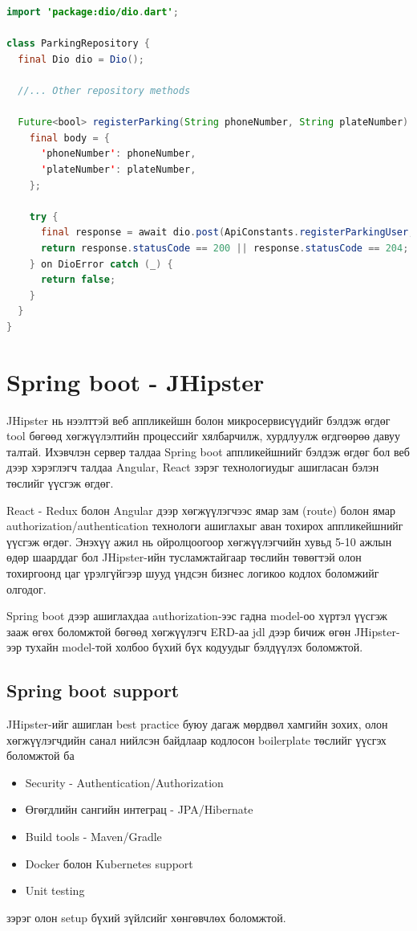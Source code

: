 \newpage

\begin{lstlisting}[language=Java, frame=single, caption=Машины дугаарыг хэрэглэгчийн дугаарын хамтаар сервер дээр бүртгэх]
import 'package:dio/dio.dart';

class ParkingRepository {
  final Dio dio = Dio();

  //... Other repository methods

  Future<bool> registerParking(String phoneNumber, String plateNumber) async {
    final body = {
      'phoneNumber': phoneNumber,
      'plateNumber': plateNumber,
    };

    try {
      final response = await dio.post(ApiConstants.registerParkingUser, data: jsonEncode(body));
      return response.statusCode == 200 || response.statusCode == 204;
    } on DioError catch (_) {
      return false;
    }
  }
}

\end{lstlisting}
\pagebreak

\section{Spring boot - JHipster}
JHipster нь нээлттэй веб аппликейшн болон микросервисүүдийг бэлдэж өгдөг tool бөгөөд хөгжүүлэлтийн процессийг хялбарчилж, хурдлуулж өгдгөөрөө давуу талтай. Ихэвчлэн сервер талдаа Spring boot аппликейшнийг бэлдэж өгдөг бол веб дээр хэрэглэгч талдаа Angular, React зэрэг технологиудыг ашигласан бэлэн төслийг үүсгэж өгдөг.

\cite{jhipster}React - Redux болон Angular дээр хөгжүүлэгчээс ямар зам (route) болон ямар authorization/authentication технологи ашиглахыг аван тохирох аппликейшнийг үүсгэж өгдөг. Энэхүү ажил нь ойролцоогоор хөгжүүлэгчийн хувьд 5-10 ажлын өдөр шаарддаг бол JHipster-ийн тусламжтайгаар төслийн төвөгтэй олон тохиргоонд цаг үрэлгүйгээр шууд үндсэн бизнес логикоо кодлох боломжийг олгодог.

Spring boot дээр ашиглахдаа authorization-ээс гадна model-оо хүртэл үүсгэж зааж өгөх боломжтой бөгөөд хөгжүүлэгч ERD-аа jdl дээр бичиж өгөн JHipster-ээр тухайн model-той холбоо бүхий бүх кодуудыг бэлдүүлэх боломжтой.

\subsection{Spring boot support}
JHipster-ийг ашиглан best practice буюу дагаж мөрдвөл хамгийн зохих, олон хөгжүүлэгчдийн санал нийлсэн байдлаар кодлосон boilerplate төслийг үүсгэх боломжтой ба 
\begin{itemize}
  \item Security - Authentication/Authorization
  \item Өгөгдлийн сангийн интеграц - JPA/Hibernate
  \item Build tools - Maven/Gradle
  \item Docker болон Kubernetes support
  \item Unit testing
\end{itemize}
зэрэг олон setup бүхий зүйлсийг хөнгөвчлөх боломжтой.

